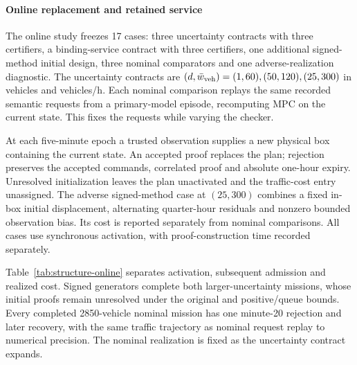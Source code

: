\documentclass[preprint,12pt]{elsarticle}
\numberwithin{equation}{section}
\begin{document}
\paragraph{Online replacement and retained service}
The online study freezes 17 cases: three uncertainty contracts with three
certifiers, a binding-service contract with three certifiers, one additional
signed-method initial design, three nominal comparators and one
adverse-realization diagnostic. The uncertainty contracts are $(d,\bar w_{\rm veh})
=(1,60),(50,120),(25,300)$ in vehicles and vehicles/h. Each nominal
comparison replays the same recorded semantic requests from a primary-model
episode, recomputing MPC on the current state. This fixes the requests
while varying the checker.

At each five-minute epoch a trusted observation supplies a new physical
box containing the current state. An accepted proof replaces the plan;
rejection preserves the accepted commands, correlated proof and absolute
one-hour expiry. Unresolved initialization leaves the plan unactivated and
the traffic-cost entry unassigned. The adverse signed-method case at
$(25,300)$ combines a fixed in-box initial displacement, alternating
quarter-hour residuals and nonzero bounded observation bias. Its cost is
reported separately from nominal comparisons. All cases use synchronous
activation, with proof-construction time recorded separately.

Table~\ref{tab:structure-online} separates activation, subsequent admission
and realized cost. Signed generators complete both larger-uncertainty
missions, whose initial proofs remain unresolved under the original and
positive/queue bounds. Every completed 2850-vehicle nominal mission has
one minute-20 rejection and later recovery, with the same traffic trajectory
as nominal request replay to numerical precision. The nominal realization
is fixed as the uncertainty contract expands.
\end{document}
